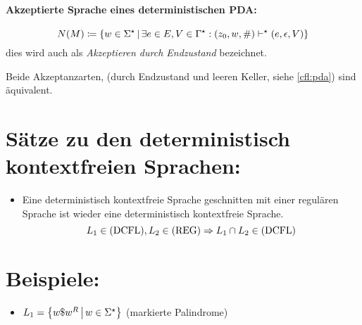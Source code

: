 \paragraph{Akzeptierte Sprache eines deterministischen PDA:}
\begin{equation*}
	N(M)\coloneqq\left\{ w\in \Sigma^\star \,\middle|\, \exists e\in E, V\in \Gamma^\star: (z_0, w, \#)\vdash^\star (e,\epsilon,V) \right\}
\end{equation*}
dies wird auch als \emph{Akzeptieren durch Endzustand} bezeichnet.

Beide Akzeptanzarten, (durch Endzustand und leeren Keller, siehe \autoref{cfl:pda}) sind äquivalent.


\section{Sätze zu den deterministisch kontextfreien Sprachen:}
\begin{itemize}
	\item Eine deterministisch kontextfreie Sprache geschnitten mit einer regulären Sprache ist wieder eine deterministisch kontextfreie Sprache.
	\begin{equation*}
		L_1\in\mathrm{(DCFL)}, L_2\in\mathrm{(REG)} \Rightarrow L_1\cap L_2\in\mathrm{(DCFL)}
\end{equation*}
\end{itemize}

\section{Beispiele: }
\begin{itemize}
	\item $L_1=\left\{ w\$w^R \,\middle|\, w\in\Sigma^\star \right\}$ (markierte Palindrome)
\end{itemize}

